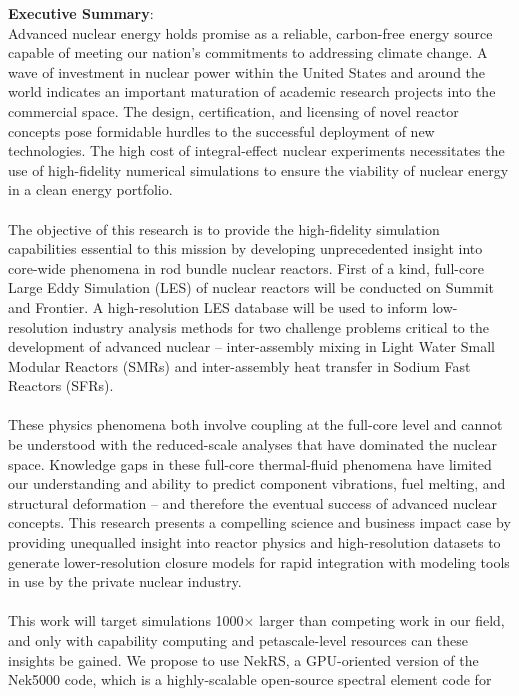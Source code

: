 \documentclass[11pt,letterpaper,english]{article}
\begin{document}
\textbf{Executive Summary}: \\
\justify
Advanced nuclear energy holds promise as a reliable, carbon-free energy source capable of
meeting our nation's commitments to addressing climate change. A wave of investment in nuclear
power within the United States and around the world indicates an important maturation of
academic research projects into the commercial space. The design, certification, and licensing
of novel reactor concepts pose formidable hurdles to the successful deployment of new technologies.
The high cost of integral-effect nuclear experiments necessitates
the use of high-fidelity numerical simulations to ensure the viability of nuclear energy
in a clean energy portfolio.\\
\\
The objective of this research is to provide the high-fidelity simulation capabilities essential
to this mission by developing unprecedented insight into core-wide phenomena in rod
bundle nuclear reactors. First of a kind, full-core Large Eddy Simulation (LES) of nuclear reactors will be
conducted on Summit and Frontier.
A high-resolution LES database will be used to inform low-resolution industry analysis
methods for two challenge problems critical to the development of advanced nuclear --
inter-assembly mixing in Light Water Small Modular Reactors (SMRs) and 
inter-assembly heat transfer in Sodium Fast Reactors (SFRs).\\
\\
These physics phenomena
both involve coupling at the full-core level and cannot be understood
with the reduced-scale analyses that have dominated the nuclear space. 
Knowledge gaps in these full-core thermal-fluid phenomena have limited
our understanding and ability to predict component vibrations, fuel melting, and
structural deformation -- and therefore the eventual success of advanced nuclear concepts.
This research presents a compelling science and business impact case
by providing unequalled insight into reactor physics and 
high-resolution datasets to generate lower-resolution closure models
for rapid integration with modeling tools in use by the private nuclear industry.\\
\\
This work will target simulations 1000\(\times\) larger than competing work in our field, and only
with capability computing and petascale-level resources can these insights be gained.
We propose to use NekRS, a GPU-oriented version of the Nek5000 code, which is
a highly-scalable open-source spectral element code for 
\end{document}
